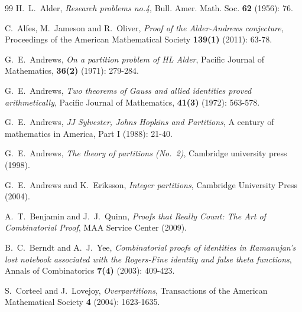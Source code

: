 \documentclass[12pt]{amsart}
\numberwithin{equation}{section}
\theoremstyle{plain}
\theoremstyle{definition}
\begin{document}
\begin{thebibliography}{99}
H.~L.~Alder, \emph{Research problems no.4}, Bull. Amer. Math. Soc. {\bf 62} (1956): 76.

C.~Alfes, M.~Jameson and R.~Oliver, \emph{Proof of the Alder-Andrews conjecture}, Proceedings of the American Mathematical Society {\bf 139(1)} (2011): 63-78.

%

G.~E.~Andrews, \emph{On a partition problem of HL Alder}, Pacific Journal of Mathematics, {\bf 36(2)} (1971): 279-284.

G.~E.~Andrews, \emph{Two theorems of Gauss and allied identities proved arithmetically}, Pacific Journal of Mathematics, {\bf 41(3)} (1972): 563-578.

G.~E.~Andrews, \emph{JJ Sylvester, Johns Hopkins and Partitions}, A century of mathematics in America, Part I (1988): 21-40.

G.~E.~Andrews, \emph{The theory of partitions (No.~2)}, Cambridge university press (1998).

G.~E.~Andrews and K.~Eriksson, \emph{Integer partitions}, Cambridge University Press (2004).


A.~T.~Benjamin and J.~J.~Quinn, \emph{Proofs that Really Count: The Art of Combinatorial Proof}, MAA Service Center (2009).

B.~C.~Berndt and A.~J.~Yee, \emph{Combinatorial proofs of identities in Ramanujan's lost notebook associated with the Rogers-Fine identity and false theta functions}, Annals of Combinatorics {\bf 7(4)} (2003): 409-423.


S.~Corteel and J.~Lovejoy, \emph{Overpartitions}, Transactions of the American Mathematical Society {\bf 4} (2004): 1623-1635.


\end{thebibliography}
\end{document}
